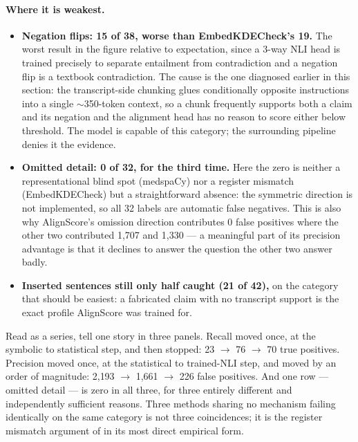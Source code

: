 \paragraph{Where it is weakest.}
\begin{itemize}
    \item \textbf{Negation flips: 15 of 38, worse than EmbedKDECheck's 19.} The
          worst result in the figure relative to expectation, since a 3-way NLI
          head is trained precisely to separate entailment from contradiction and
          a negation flip is a textbook contradiction. The cause is the one
          diagnosed earlier in this section: the transcript-side chunking glues
          conditionally opposite instructions into a single $\sim$350-token context,
          so a chunk frequently supports both a claim and its negation and the
          alignment head has no reason to score either below threshold. The model is
          capable of this category; the surrounding pipeline denies it the evidence.
    \item \textbf{Omitted detail: 0 of 32, for the third time.} Here the zero is
          neither a representational blind spot (medspaCy) nor a register mismatch
          (EmbedKDECheck) but a straightforward absence: the symmetric direction is
          not implemented, so all 32 labels are automatic false negatives. This is
          also why AlignScore's omission direction contributes 0 false positives
          where the other two contributed 1{,}707 and 1{,}330 --- a meaningful part
          of its precision advantage is that it declines to answer the question the
          other two answer badly.
    \item \textbf{Inserted sentences still only half caught (21 of 42),} on the
          category that should be easiest: a fabricated claim with no transcript
          support is the exact profile AlignScore was trained for.
\end{itemize}

Read as a series, 
tell one story in three panels. Recall moved once, at the symbolic to statistical
step, and then stopped: 23 $\rightarrow$ 76 $\rightarrow$ 70 true positives. Precision
moved once, at the statistical to trained-NLI step, and moved by an order of
magnitude: 2{,}193 $\rightarrow$ 1{,}661 $\rightarrow$ 226 false positives. And one row
--- omitted detail --- is zero in all three, for three entirely different and
independently sufficient reasons. Three methods sharing no mechanism failing
identically on the same category is not three coincidences; it is the register
mismatch argument of  in its most direct empirical form.


